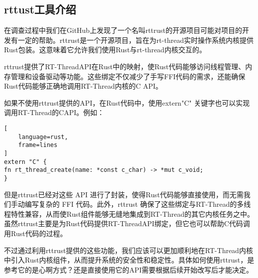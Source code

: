 
\subsection{rttust工具介绍}
\indent 在调查过程中我们在GitHub上发现了一个名叫rttrust的开源项目\cite{rttrust}可能对项目的开发有一定的帮助。rttrust是一个开源项目，旨在为rt-thread实时操作系统内核提供Rust包装。这意味着它允许我们使用Rust与rt-thread内核交互的。

rttrust提供了RT-Thread\space API在Rust中的映射，使Rust代码能够访问线程管理、内存管理和设备驱动等功能。这些绑定不仅减少了手写FFI代码的需求，还能确保Rust代码能够正确地调用RT-Thread内核的C \space API。

如果不使用rttrust提供的API，在Rust代码中，使用extern\space "C" 关键字也可以实现调用RT-Thread的C\space API。例如：
\begin{lstlisting}[
    language=rust,
    frame=lines
]
extern "C" {
fn rt_thread_create(name: *const c_char) -> *mut c_void;
}
\end{lstlisting}

但是rttrust已经对这些 API 进行了封装，使得Rust代码能够直接使用，而无需我们手动编写复杂的 FFI 代码。此外，rttrust 确保了这些绑定与RT-Thread的多线程特性兼容，从而使Rust组件能够无缝地集成到RT-Thread的其它内核任务之中。虽然rttrust主要是为Rust代码提供RT-Thread\space API绑定，但它也可以帮助C代码调用Rust代码的过程。

不过通过利用rttrust提供的这些功能，我们应该可以更加顺利地在RT-Thread内核中引入Rust内核组件，从而提升系统的安全性和稳定性。具体如何使用rttrust，是参考它的是心啊方式？还是直接使用它的API需要根据后续开始改写后才能决定。